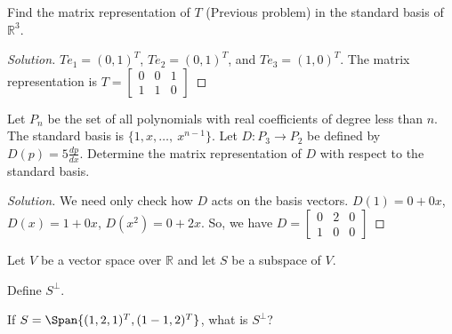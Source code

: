 \documentclass[crop=false,class=book,oneside]{standalone}                      %
\begin{document}
        \begin{problem}
        Find the matrix representation of $T$ (Previous problem) in the standard basis of $\mathbb{R}^3$.
        \end{problem}
        \begin{proof}[Solution]
        $Te_1 = (0,1)^T$, $T e_2 = (0,1)^T$, and $Te_3 = (1,0)^T$. The matrix representation is $T=\begin{bmatrix} 0 & 0 & 1 \\ 1 & 1 & 0 \end{bmatrix}$
        \end{proof}
        \begin{problem}
        Let $P_n$ be the set of all polynomials with real coefficients of degree less than $n$. The standard basis is $\{1,x,\hdots, \ x^{n-1}\}$. Let $D:P_3 \rightarrow P_2$ be defined by $D(p) = 5\frac{dp}{dx}$. Determine the matrix representation of $D$ with respect to the standard basis.
        \end{problem}
        \begin{proof}[Solution]
        We need only check how $D$ acts on the basis vectors. $D(1) = 0+0x$, $D(x) = 1+0x$, $D(x^2) = 0+2x$. So, we have $D = \begin{bmatrix} 0 & 2 & 0 \\ 1 & 0 & 0 \end{bmatrix}$
        \end{proof}
        \begin{problem}
        Let $V$ be a vector space over $\mathbb{R}$ and let $S$ be a subspace of $V$.
        \begin{enumerate}
        \begin{multicols}{2}
            \item Define $S^{\perp}$.
            \item If $S=\Span\{ (1,2,1)^T, (1-1,2)^T\}$, what is $S^{\perp}$?
        \end{multicols}
        \end{enumerate}
        \end{problem}
\end{document}
